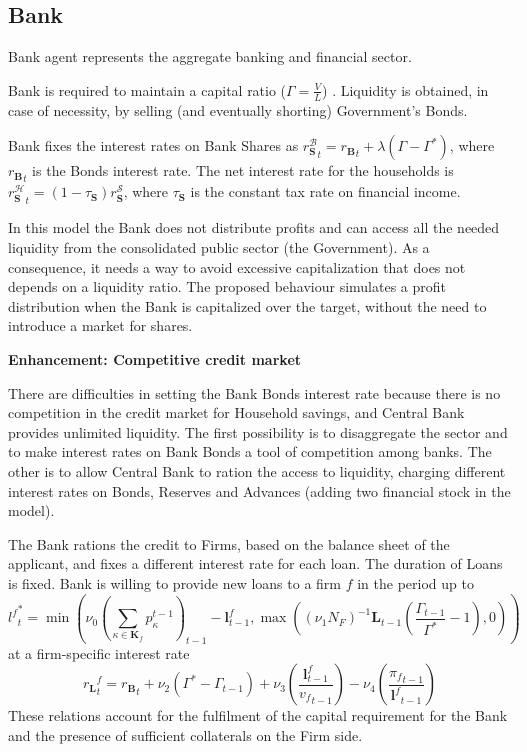 \documentclass[a4paper, headings=standardclasses]{scrartcl}
\newenvironment{enh}[1][]{\begin{framed}\noindent\textbf{Enhancement: #1}\par}{\end{framed}}
\begin{document}
\subsection{Bank}
Bank agent represents the aggregate banking and financial sector.

Bank is required to maintain a capital ratio ($\Gamma = \frac{V}{L}$) \parencite[see][]{caiani2016}. Liquidity is obtained, in case of necessity, by selling (and eventually shorting) Government's Bonds.

Bank fixes the interest rates on Bank Shares as ${r_\mathbf{S}^\mathcal{B}}_t = {r_\mathbf{B}}_t + \lambda(\Gamma - \Gamma^*)$, where ${r_\mathbf{B}}_t$ is the Bonds interest rate. The net interest rate for the households is ${r^\mathcal{H}_\mathbf{S}}_t = (1-\tau_\mathbf{S}) r^\mathcal{S}_\mathbf{S}$, where $\tau_\mathbf{S}$ is the constant tax rate on financial income.

In this model the Bank does not distribute profits and can access all the needed liquidity from the consolidated public sector (the Government). As a consequence, it needs a way to avoid excessive capitalization that does not depends on a liquidity ratio. The proposed behaviour simulates a profit distribution when the Bank is capitalized over the target, without the need to introduce a market for shares.

\begin{enh}[Competitive credit market]
    There are difficulties in setting the Bank Bonds interest rate because there is no competition in the credit market for Household savings, and Central Bank provides unlimited liquidity.
    The first possibility is to disaggregate the sector and to make interest rates on Bank Bonds a tool of competition among banks.
    The other is to allow Central Bank to ration the access to liquidity, charging different interest rates on Bonds, Reserves and Advances (adding two financial stock in the model).
\end{enh}

The Bank rations the credit to Firms, based on the balance sheet of the applicant, and fixes a different interest rate for each loan. The duration of Loans is fixed.
Bank is willing to provide new loans to a firm $f$ in the period up to $${l^f}^*_t = \min (\nu_0 (\sum_{\kappa \in \mathbf{K}_f} p^{t-1}_\kappa)_{t-1} - \mathbf{l}^f_{t-1}, \max((\nu_1 N_F)^{-1} \mathbf{L}_{t-1} (\frac{\Gamma_{t-1}}{\Gamma^*}-1),0))$$ at a firm-specific interest rate $${r_\mathbf{L}}^f_t = {r_\mathbf{B}}_t + \nu_2 (\Gamma^* - \Gamma_{t-1}) + \nu_3 (\frac{\mathbf{l}^f_{t-1}}{{v_f}_{t-1}}) - \nu_4 (\frac{{\pi_f}_{t-1}}{{\mathbf{l}^f}_{t-1}})$$
These relations account for the fulfilment of the capital requirement for the Bank and the presence of sufficient collaterals on the Firm side.
\end{document}
